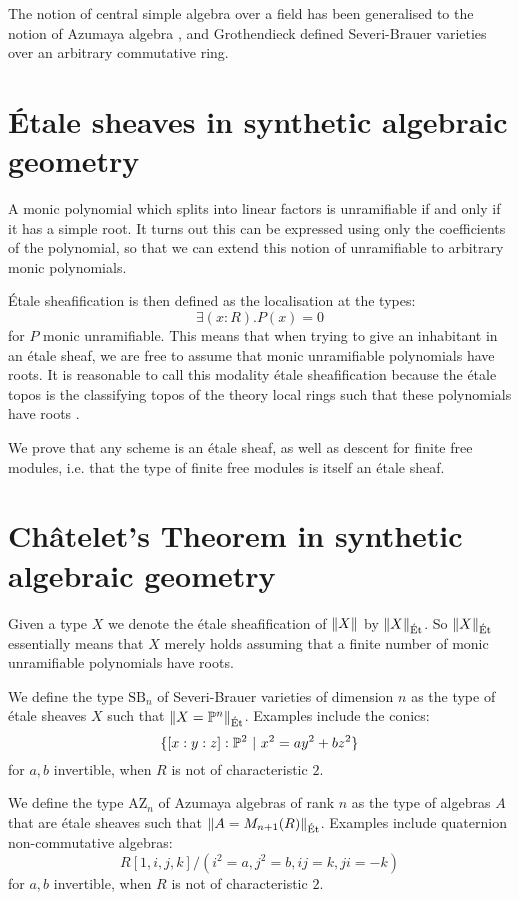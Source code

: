 \documentclass{../util/zariski}
\newcommand{\SB}{\mathrm{SB}}
\newcommand{\AZ}{\mathrm{AZ}}
\newcommand{\propTruncEt}[1]{\propTrunc{#1}_{\mathrm{\acute{E}t}}}
\begin{document}
The notion of central simple algebra over a field
has been generalised to the notion of Azumaya algebra  \cite{azumaya51}, and
Grothendieck \cite{grothendieck68} defined Severi-Brauer varieties over an arbitrary commutative ring.


\section{Étale sheaves in synthetic algebraic geometry}

A monic polynomial which splits into linear factors is unramifiable if and only if it has a simple root. It turns out this can be expressed using only the coefficients of the polynomial, so that we can extend this notion of unramifiable to arbitrary monic polynomials.

Étale sheafification is then defined as the localisation \cite{modalities} at the types: 
\[\exists (x:R).P(x)=0\] 
for $P$ monic unramifiable. This means that when trying to give an inhabitant in an étale sheaf, we are free to assume that monic unramifiable polynomials have roots. It is reasonable to call this modality étale sheafification because the étale topos is the classifying topos of the theory local rings such that these polynomials have roots \cite{wraith79}.

We prove that any scheme is an étale sheaf, as well as descent for finite free modules, i.e. that the type of finite free modules is itself an étale sheaf.


\section{Ch\^atelet's Theorem in synthetic algebraic geometry}

Given a type $X$ we denote the étale sheafification of $\lVert X \rVert$ by $\propTruncEt{X}$. So $\propTruncEt{X}$ essentially means that $X$ merely holds assuming that a finite number of monic unramifiable polynomials have roots.

We define the type $\SB_n$ of Severi-Brauer varieties of dimension $n$ as the type of étale sheaves $X$ such that $\lVert X=\mathbb{P}^n \rVert_{\mathrm{\acute{E}t}}$. Examples include the conics:
\[\{[x:y:z]:\mathbb{P}^2\ |\ x^2 = ay^2+bz^2\}\]
for $a,b$ invertible, when $R$ is not of characteristic $2$.

We define the type $\AZ_n$ of Azumaya algebras of rank $n$ as the type of algebras $A$ that are étale sheaves such that $\lVert A=M_{n+1}(R) \rVert_{\mathrm{\acute{E}t}}$. Examples include quaternion non-commutative algebras: 
\[R[1,i,j,k]/(i^2=a,j^2=b,ij=k,ji=-k)\]
for $a,b$ invertible, when $R$ is not of characteristic $2$.
\end{document}
